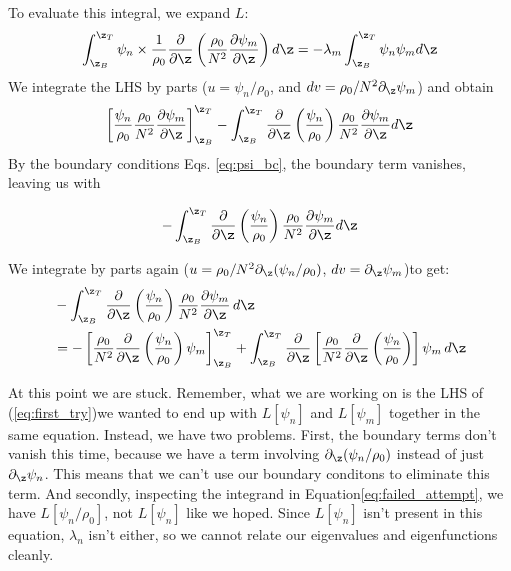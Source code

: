 To evaluate this integral, we expand $L$:
\begin{equation}
  \int_{\z_B}^{\z_T}\psi_n\times\frac{1}{\rho_0}\frac{\partial}{\partial\z}\left(\frac{\rho_0}{N^2}\frac{\partial\psi_m}{\partial\z}\right)d\z  = -\lambda_m\int_{\z_B}^{\z_T}\psi_n\psi_md\z 
\end{equation}
We integrate the LHS by parts ($u=\psi_n/\rho_0$, and $dv=\rho_0/N^2\partial_{\z}\psi_m$) and obtain
\begin{equation}
  \left[\frac{\psi_n}{\rho_0}\frac{\rho_0}{N^2}\frac{\partial\psi_m}{\partial\z}\right]_{\z_B}^{\z_T}-\int_{\z_B}^{\z_T}\frac{\partial}{\partial\z}\left(\frac{\psi_n}{\rho_0}\right)\frac{\rho_0}{N^2}\frac{\partial\psi_m}{\partial\z}d\z
\end{equation}
By the boundary conditions Eqs. \ref{eq:psi_bc}, the boundary term vanishes, leaving us with 

\begin{equation}
-\int_{\z_B}^{\z_T}\frac{\partial}{\partial\z}\left(\frac{\psi_n}{\rho_0}\right)\frac{\rho_0}{N^2}\frac{\partial\psi_m}{\partial\z}d\z
\end{equation}

We integrate by parts again ($u=\rho_0/N^2\partial_{\z}(\psi_n/\rho_0)$, $dv=\partial_{\z}\psi_m$)to get:
\begin{align}
&-\int_{\z_B}^{\z_T}\frac{\partial}{\partial\z}\left(\frac{\psi_n}{\rho_0}\right)\frac{\rho_0}{N^2}\frac{\partial\psi_m}{\partial\z}\,d\z \\
& = -\left[\frac{\rho_0}{N^2}\frac{\partial}{\partial\z}\left(\frac{\psi_n}{\rho_0}\right)\psi_m\right]_{\z_B}^{\z_T} + \int_{\z_B}^{\z_T}\frac{\partial}{\partial \z}\left[\frac{\rho_0}{N^2}\frac{\partial}{\partial\z}\left(\frac{\psi_n}{\rho_0}\right)\right]\psi_m\,d\z
\label{eq:failed_attempt}
\end{align}



At this point we are stuck. Remember, what we are working on is the LHS of (\ref{eq:first_try})we wanted to end up with $L[\psi_n]$ and $L[\psi_m]$ together in the same equation. Instead, we have two problems. First, the boundary terms don't vanish this time, because we have a term involving $\partial_{\z}(\psi_n/\rho_0)$ instead of just $\partial_{\z}\psi_n$. This means that we can't use our boundary conditons to eliminate this term. And secondly, inspecting the integrand in Equation\ref{eq:failed_attempt}, we have $L[\psi_n/\rho_0]$, not $L[\psi_n]$ like we hoped. Since $L[\psi_n]$ isn't present in this equation, $\lambda_n$ isn't either, so we cannot relate our eigenvalues and eigenfunctions cleanly. 

